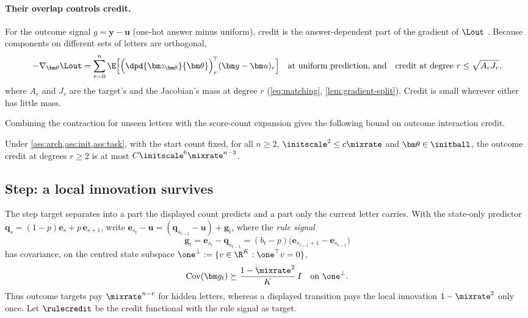 \paragraph{Their overlap controls credit.} For the outcome signal $g=\bm y-\bm u$ (one-hot answer minus uniform), credit is the answer-dependent part of the gradient of
$\Lout$ \citep{shalevshwartz2017failures,abbe2025parities}. Because components on different sets of letters are
orthogonal,
\begin{equation}
 -\nabla_{\bm\theta}\Lout
 =\sum_{r=0}^n\E\Bigl[\Bigl(\dpd{\bm z_{\bm\theta}}{\bm\theta}\Bigr)_r^{\!\top}(\bm y-\bm u)_r\Bigr]
 \quad\text{at uniform prediction, and}\quad
 \text{credit at degree } r\le\sqrt{A_rJ_r},
 \label{eq:credit-degree}
\end{equation}
where $A_r$ and $J_r$ are the target's and the Jacobian's mass at degree $r$ (\cref{eq:matching},
\cref{lem:gradient-split}). Credit is small wherever either has little mass.

Combining the contraction for unseen letters with the score-count expansion gives the following bound on outcome interaction credit.

\begin{theorem}
\label{thm:main}
Under \cref{ass:arch,ass:init,ass:task}, with the start count fixed, for all $n\ge2$, $\initscale^2\le c\mixrate$ and
$\bm\theta\in\initball$, the outcome credit at degrees $r\ge2$ is at most $C\initscale^6\mixrate^{n-3}$.
\end{theorem}

\subsection{Step: a local innovation survives}
The step target separates into a part the displayed count predicts and a part only the current letter carries. With the
state-only predictor $\bm q_s=(1-p)\bm e_s+p\,\bm e_{s+1}$, write $\bm e_{s_t}-\bm u=(\bm q_{s_{t-1}}-\bm u)+\bm g_t$, where the
\emph{rule signal}
\[
 \bm g_t=\bm e_{s_t}-\bm q_{s_{t-1}}=(b_t-p)\bigl(\bm e_{s_{t-1}+1}-\bm e_{s_{t-1}}\bigr)
\]
has covariance, on the centred state subspace $\one^\perp:=\{v\in\R^K:\one^\top v=0\}$,
\begin{equation}
 \operatorname{Cov}(\bm g_t)\succeq\frac{1-\mixrate^2}{K}\,I
 \quad\text{on }\one^\perp.
 \label{eq:local-variation}
\end{equation}
Thus outcome targets pay $\mixrate^{n-r}$ for hidden letters, whereas a displayed transition pays the local innovation
$1-\mixrate^2$ only once. Let $\rulecredit$ be the credit
functional with the rule signal as target.

